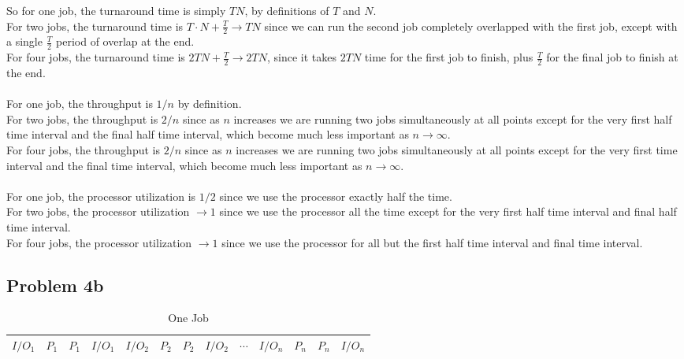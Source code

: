 \documentclass[12pt]{article}
\begin{document}
\noindent So for one job, the turnaround time is simply $TN$, by definitions of $T$ and $N$.\\
For two jobs, the turnaround time is $T \cdot N + \frac{T}{2} \rightarrow TN$ since we can run the second job completely overlapped with the first job, except with a single $\frac{T}{2}$ period of overlap at the end.\\
For four jobs, the turnaround time is $2TN  + \frac{T}{2} \rightarrow 2TN$, since it takes $2TN$ time for the first job to finish, plus $\frac{T}{2}$ for the final job to finish at the end.\\
\\
For one job, the throughput is $1/n$ by definition.\\
For two jobs, the throughput is $2/n$ since as $n$ increases we are running two jobs simultaneously at all points except for the very first half time interval and the final half time interval, which become much less important as $n \rightarrow \infty $.\\
For four jobs, the throughput is $2/n$ since as $n$ increases we are running two jobs simultaneously at all points except for the very first time interval and the final time interval, which become much less important as $n \rightarrow \infty$.\\
\\
For one job, the processor utilization is $1/2$ since we use the processor exactly half the time.\\
For two jobs, the processor utilization $\rightarrow 1$ since we use the processor all the time except for the very first half time interval and final half time interval.\\
For four jobs, the processor utilization $\rightarrow 1$ since we use the processor for all but the first half time interval and final time interval. 

	\subsection*{Problem 4b}
	
\begin{table}[h]
    \begin{tabular}{|c|c|c|c|c|c|c|c|c|c|c|c|c|}
    \hline
    $I/O_1$ & $P_1$ & $P_1$ & $I/O_1$ & $I/O_2$ & $P_2$ & $P_2$ & $I/O_2$ & $\cdots$ & $I/O_n$ & $P_n$ & $P_n$ & $I/O_n$ \\ \hline
    \end{tabular}
    \caption {One Job}
\end{table}
\end{document}
